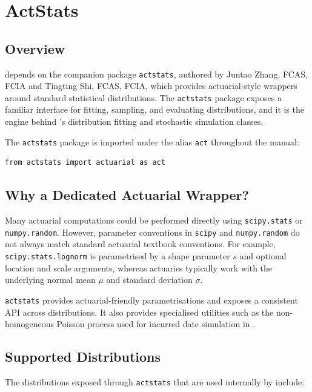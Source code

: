 \chapter{ActStats}
\label{chap:actstats}

\section{Overview}

\actsim depends on the companion package \texttt{actstats}, authored by 
Juntao Zhang, FCAS, FCIA and Tingting Shi, FCAS, FCIA, which provides actuarial-style wrappers 
around standard statistical distributions. The \texttt{actstats} package 
exposes a familiar interface for fitting, sampling, and evaluating 
distributions, and it is the engine behind \actsim's distribution 
fitting and stochastic simulation classes.

The \texttt{actstats} package is imported under the alias
\texttt{act} throughout the manual:

\begin{lstlisting}[style=pythonstyle]
from actstats import actuarial as act
\end{lstlisting}

\section{Why a Dedicated Actuarial Wrapper?}

Many actuarial computations could be performed directly using
\texttt{scipy.stats} or \texttt{numpy.random}. However, parameter conventions 
in \texttt{scipy} and \texttt{numpy.random} do not always match standard 
actuarial textbook conventions. For example, \texttt{scipy.stats.lognorm} 
is parametrised by a shape parameter $s$ and optional location and scale 
arguments, whereas actuaries typically work with the underlying normal mean 
$\mu$ and standard deviation $\sigma$.

\texttt{actstats} provides actuarial-friendly parametrisations and
exposes a consistent API across distributions. It also provides
specialised utilities such as the non-homogeneous Poisson process used
for incurred date simulation in \actsim.

\section{Supported Distributions}

The distributions exposed through \texttt{actstats} that are used
internally by \actsim include:

